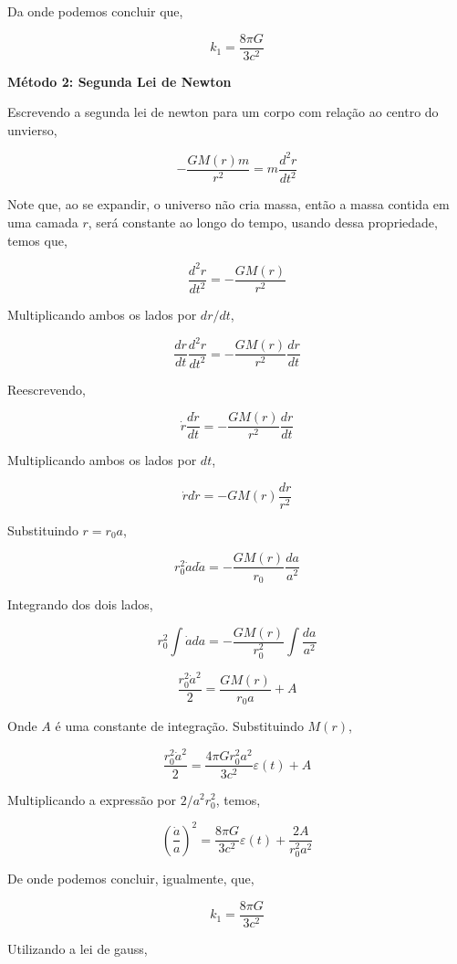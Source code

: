 \documentclass[11pt]{article}
\begin{document}
\begin{pproblem}
\begin{pssolution*}{}{}
\begin{alternativas}
        Da onde podemos concluir que, 

        \[\boxed{k_1 = \frac{8\pi G}{3c^2}}\]


        \textbf{Método 2: Segunda Lei de Newton}

        Escrevendo a segunda lei de newton para um corpo com relação ao centro do unvierso, 

        \[-\frac{GM(r)m}{r^2} = m\frac{d^2r}{dt^2}\]

        Note que, ao se expandir, o universo não cria massa, então a massa contida em uma camada \(r\), será constante ao longo do tempo, usando dessa propriedade, temos que, 

        \[\frac{d^2r}{dt^2} = -\frac{GM(r)}{r^2}\]

        Multiplicando ambos os lados por \(dr/dt\), 

        \[\frac{dr}{dt}\frac{d^2r}{dt^2} = -\frac{GM(r)}{r^2}\frac{dr}{dt}\]

        Reescrevendo, 

        \[\dot{r}\frac{d\dot{r}}{dt} = -\frac{GM(r)}{r^2}\frac{dr}{dt}\]

        Multiplicando ambos os lados por \(dt\), 

        \[\dot{r}d\dot{r} = -GM(r)\frac{dr}{r^2}\]

        Substituindo \(r = r_0a\), 

        \[r_0^2\dot{a}d\dot{a} = -\frac{GM(r)}{r_0} \frac{da}{a^2}\]

        Integrando dos dois lados, 

        \[r_0^2\int\dot{a}da = -\frac{GM(r)}{r_0^2} \int\frac{da}{a^2}\]

        \[\frac{r_0^2\dot{a}^2}{2} = \frac{GM(r)}{r_0 a} + A\]

        Onde \(A\) é uma constante de integração. Substituindo \(M(r)\), 

        \[\frac{r_0^2\dot{a}^2}{2} = \frac{4\pi G r_0^2 a^2}{3c^2}\varepsilon(t) + A\]

        Multiplicando a expressão por \(2/a^2r_0^2\), temos, 

        \[\left(\frac{\dot{a}}{a}\right)^2 = \frac{8\pi G}{3c^2} \varepsilon(t) + \frac{2A}{r_0^2a^2}\]
    
        De onde podemos concluir, igualmente, que, 

        \[\boxed{k_1 = \frac{8\pi G}{3c^2}}\]

        \item Utilizando a lei de gauss, 
        

\end{alternativas}
\end{pssolution*}
\end{pproblem}
\end{document}
